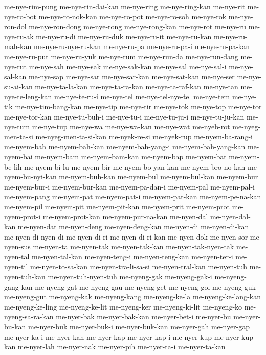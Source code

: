 {me-nye-rim-pung me-nye-rin-dai-kan me-nye-ring me-nye-ring-kan me-nye-rit
me-nye-ro-bot me-nye-ro-nok-kan me-nye-ro-pot me-nye-ro-soh me-nye-rok
me-nye-ron-dol me-nye-ron-dong me-nye-rong me-nye-rong-kan me-nye-rot
me-nye-ru me-nye-ru-ak me-nye-ru-di me-nye-ru-duk me-nye-ru-it
me-nye-ru-kan me-nye-ru-mah-kan me-nye-ru-nye-ru-kan me-nye-ru-pa
me-nye-ru-pa-i me-nye-ru-pa-kan me-nye-ru-put me-nye-ru-yuk me-nye-rum
me-nye-run-da me-nye-run-dang me-nye-rut me-nye-sah me-nye-sak
me-nye-sak-kan me-nye-sal me-nye-sal-i me-nye-sal-kan me-nye-sap
me-nye-sar me-nye-sar-kan me-nye-sat-kan me-nye-ser me-nye-su-ai-kan
me-nye-ta-la-kan me-nye-ta-ra-kan me-nye-ta-raf-kan me-nye-tan
me-nye-te-leng-kan me-nye-te-ru-i me-nye-tel me-nye-tel-nye-tel me-nye-tem
me-nye-tik me-nye-tim-bang-kan me-nye-tip me-nye-tir me-nye-tok me-nye-top
me-nye-tor me-nye-tor-kan me-nye-tu-buh-i me-nye-tu-i me-nye-tu-ju-i
me-nye-tu-ju-kan me-nye-tum me-nye-tup me-nye-wa me-nye-wa-kan me-nye-wat
me-nyeb-rot me-nyeg-men-ta-si me-nyeg-men-ta-si-kan me-nyek-re-si
me-nyek-rup me-nyem-ba-rang-i me-nyem-bah me-nyem-bah-kan
me-nyem-bah-yang-i me-nyem-bah-yang-kan me-nyem-bai me-nyem-bam
me-nyem-bam-kan me-nyem-bap me-nyem-bat me-nyem-be-lih me-nyem-bi-lu
me-nyem-bir me-nyem-bo-yan-kan me-nyem-bro-no-kan me-nyem-bu-nyi-kan
me-nyem-buh-kan me-nyem-bul me-nyem-bul-kan me-nyem-bur me-nyem-bur-i
me-nyem-bur-kan me-nyem-pa-dan-i me-nyem-pal me-nyem-pal-i me-nyem-pang
me-nyem-pat me-nyem-pat-i me-nyem-pat-kan me-nyem-pe-na-kan me-nyem-pil
me-nyem-pit me-nyem-pit-kan me-nyem-prit me-nyem-prot me-nyem-prot-i
me-nyem-prot-kan me-nyem-pur-na-kan me-nyen-dal me-nyen-dal-kan
me-nyen-dat me-nyen-deng me-nyen-deng-kan me-nyen-di me-nyen-di-kan
me-nyen-di-nyen-di me-nyen-di-ri me-nyen-di-ri-kan me-nyen-dok me-nyen-sor
me-nyen-sus me-nyen-ta me-nyen-tak me-nyen-tak-kan me-nyen-tak-nyen-tak
me-nyen-tal me-nyen-tal-kan me-nyen-teng-i me-nyen-teng-kan me-nyen-ter-i
me-nyen-til me-nyen-to-sa-kan me-nyen-tra-li-sa-si me-nyen-tral-kan
me-nyen-tuh me-nyen-tuh-kan me-nyen-tuh-nyen-tuh me-nyeng-gak
me-nyeng-gak-i me-nyeng-gang-kan me-nyeng-gat me-nyeng-gau me-nyeng-get
me-nyeng-gol me-nyeng-guk me-nyeng-gut me-nyeng-kak me-nyeng-kang
me-nyeng-ke-la me-nyeng-ke-lang-kan me-nyeng-ke-ling me-nyeng-ke-lit
me-nyeng-ker me-nyeng-ki-lit me-nyeng-ko me-nyeng-sa-ra-kan me-nyer-bak
me-nyer-bak-kan me-nyer-bet-i me-nyer-bu me-nyer-bu-kan me-nyer-buk
me-nyer-buk-i me-nyer-buk-kan me-nyer-gah me-nyer-gap me-nyer-ka-i
me-nyer-kah me-nyer-kap me-nyer-kap-i me-nyer-kup me-nyer-kup-kan
me-nyer-lah me-nyer-nak me-nyer-pih me-nyer-ta-i me-nyer-ta-kan
}
